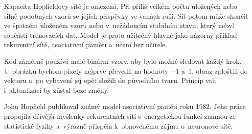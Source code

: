 

Kapacita Hopfieldovy sítě je omezená. Při příliš velkém počtu uložených nebo silně podobných vzorů se jejich příspěvky ve vahách ruší. Síť potom může skončit ve špatném uloženém vzoru nebo v~nežádoucím stabilním stavu, který nebyl součástí trénovacích dat. Model je proto užitečný hlavně jako názorný příklad rekurentní sítě, asociativní paměti a~učení bez učitele.

Kód záměrně používá malé binární vzory, aby bylo možné sledovat každý krok. U~obrázků bychom pixely nejprve převedli na hodnoty \(-1\) a~\(1\), obraz zploštili do vektoru a~po vybavení jej opět složili do původního tvaru. Princip vah i~aktualizací by zůstal beze změny.

\begin{remark}
    John Hopfield publikoval známý model asociativní paměti roku 1982. Jeho práce propojila dřívější myšlenky rekurentních sítí s~energetickou funkcí známou ze statistické fyziky a~výrazně přispěla k~obnovenému zájmu o~neuronové sítě.
\end{remark}
